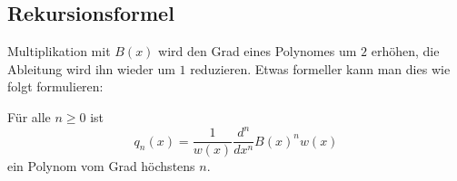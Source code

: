 %
%
\subsection{Rekursionsformel}
Multiplikation mit $B(x)$ wird den Grad eines Polynomes 
um $2$ erhöhen, die Ableitung wird ihn wieder um $1$ reduzieren.
Etwas formeller kann man dies wie folgt formulieren:

\begin{satz}
\label{buch:orthogonal:rodrigues:satz:rekursion}
%
Für alle $n\ge 0$ ist
\begin{equation}
q_n(x)
=
\frac{1}{w(x)}
\frac{d^n}{dx^n} B(x)^n w(x)
\label{buch:orthogonalitaet:rodrigues:eqn:rekursion}
\end{equation}
ein Polynom vom Grad höchstens $n$.
\end{satz}

